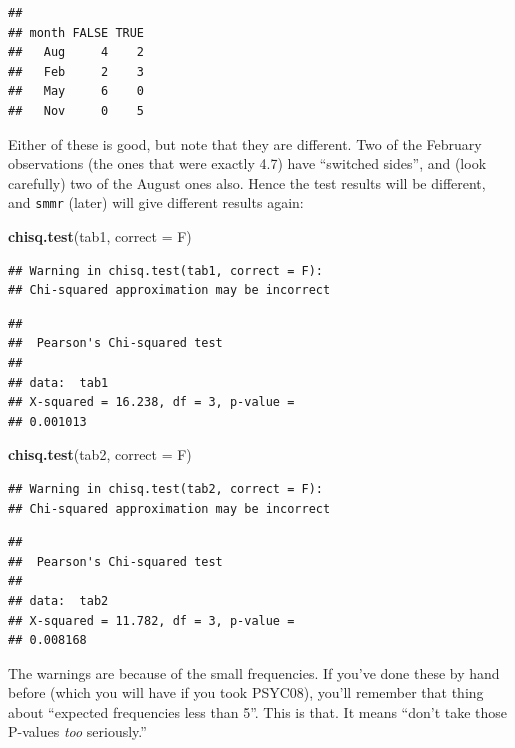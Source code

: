 \documentclass[]{tufte-book}
\newenvironment{Shaded}{}{}
\newcommand{\DataTypeTok}[1]{\textcolor[rgb]{0.56,0.13,0.00}{#1}}
\newcommand{\KeywordTok}[1]{\textcolor[rgb]{0.00,0.44,0.13}{\textbf{#1}}}
\newcommand{\NormalTok}[1]{#1}
\theoremstyle{definition}
\theoremstyle{definition}
\theoremstyle{definition}
\theoremstyle{remark}
\begin{document}
\begin{verbatim}
##      
## month FALSE TRUE
##   Aug     4    2
##   Feb     2    3
##   May     6    0
##   Nov     0    5
\end{verbatim}

Either of these is good, but note that they are different. Two of the
February observations (the ones that were exactly 4.7) have ``switched
sides'', and (look carefully) two of the August ones also. Hence the
test results will be different, and \texttt{smmr} (later) will give
different results again:

\begin{Shaded}
\begin{Highlighting}[]
\KeywordTok{chisq.test}\NormalTok{(tab1, }\DataTypeTok{correct =}\NormalTok{ F)}
\end{Highlighting}
\end{Shaded}

\begin{verbatim}
## Warning in chisq.test(tab1, correct = F):
## Chi-squared approximation may be incorrect
\end{verbatim}

\begin{verbatim}
## 
##  Pearson's Chi-squared test
## 
## data:  tab1
## X-squared = 16.238, df = 3, p-value =
## 0.001013
\end{verbatim}

\begin{Shaded}
\begin{Highlighting}[]
\KeywordTok{chisq.test}\NormalTok{(tab2, }\DataTypeTok{correct =}\NormalTok{ F)}
\end{Highlighting}
\end{Shaded}

\begin{verbatim}
## Warning in chisq.test(tab2, correct = F):
## Chi-squared approximation may be incorrect
\end{verbatim}

\begin{verbatim}
## 
##  Pearson's Chi-squared test
## 
## data:  tab2
## X-squared = 11.782, df = 3, p-value =
## 0.008168
\end{verbatim}

The warnings are because of the small frequencies. If you've done these
by hand before (which you will have if you took PSYC08), you'll remember
that thing about ``expected frequencies less than 5''. This is that. It
means ``don't take those P-values \emph{too} seriously.''
\end{document}
